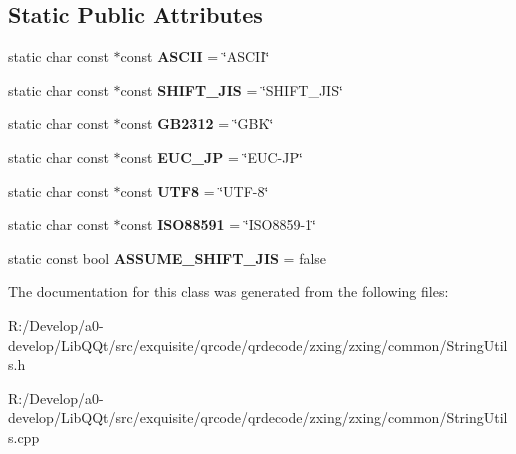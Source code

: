 \subsection*{Static Public Attributes}
\begin{DoxyCompactItemize}
\item 
\mbox{\label{classzxing_1_1common_1_1_string_utils_acd53f897e9445d28b0b19cadd3a45fa9}} 
static char const  $\ast$const {\bfseries A\+S\+C\+II} = \char`\"{}A\+S\+C\+II\char`\"{}
\item 
\mbox{\label{classzxing_1_1common_1_1_string_utils_ad56649ba4d062aaa05e12307ca9213ac}} 
static char const  $\ast$const {\bfseries S\+H\+I\+F\+T\+\_\+\+J\+IS} = \char`\"{}S\+H\+I\+F\+T\+\_\+\+J\+IS\char`\"{}
\item 
\mbox{\label{classzxing_1_1common_1_1_string_utils_a8fc5fa890587eb32a8bd6d69d8342e71}} 
static char const  $\ast$const {\bfseries G\+B2312} = \char`\"{}G\+BK\char`\"{}
\item 
\mbox{\label{classzxing_1_1common_1_1_string_utils_ad6c1c87e05f323f8c273dcd87aed2fde}} 
static char const  $\ast$const {\bfseries E\+U\+C\+\_\+\+JP} = \char`\"{}E\+UC-\/JP\char`\"{}
\item 
\mbox{\label{classzxing_1_1common_1_1_string_utils_a0d3aec53496c0cd4f971d7807ae6381c}} 
static char const  $\ast$const {\bfseries U\+T\+F8} = \char`\"{}U\+TF-\/8\char`\"{}
\item 
\mbox{\label{classzxing_1_1common_1_1_string_utils_a2b713b90d5c65c4793bc40099bcc8b11}} 
static char const  $\ast$const {\bfseries I\+S\+O88591} = \char`\"{}I\+S\+O8859-\/1\char`\"{}
\item 
\mbox{\label{classzxing_1_1common_1_1_string_utils_a3500f3891a50d14a4d69ad512a02c9b5}} 
static const bool {\bfseries A\+S\+S\+U\+M\+E\+\_\+\+S\+H\+I\+F\+T\+\_\+\+J\+IS} = false
\end{DoxyCompactItemize}


The documentation for this class was generated from the following files\+:\begin{DoxyCompactItemize}
\item 
R\+:/\+Develop/a0-\/develop/\+Lib\+Q\+Qt/src/exquisite/qrcode/qrdecode/zxing/zxing/common/String\+Utils.\+h\item 
R\+:/\+Develop/a0-\/develop/\+Lib\+Q\+Qt/src/exquisite/qrcode/qrdecode/zxing/zxing/common/String\+Utils.\+cpp\end{DoxyCompactItemize}
